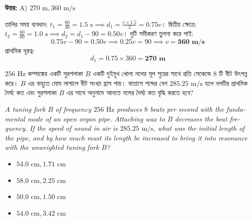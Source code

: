 \documentclass[12pt, a4paper]{article}
\begin{document}
\vspace{0.5em}
\begin{tcolorbox}[answerbox]
    \textbf{\color{success} উত্তর:} A) $270\text{ m}, 360\text{ m/s}$
\end{tcolorbox}
\vspace{1em}

\begin{tcolorbox}[solutionbox={সমাধান (Solution)}]
    \noindent
    তালির সময় ব্যবধান: $t_1 = \frac{60}{40} = 1.5\text{ s} \implies d_1 = \frac{v \times 1.5}{2} = 0.75v$।
    দ্বিতীয় ক্ষেত্রে: $t_2 = \frac{60}{60} = 1.0\text{ s} \implies d_2 = d_1 - 90 = 0.50v$।
    দুটি সমীকরণ তুলনা করে পাই:
    \[ 0.75v - 90 = 0.50v \implies 0.25v = 90 \implies v = \mathbf{360\text{ m/s}} \]
    প্রাথমিক দূরত্ব:
    \[ d_1 = 0.75 \times 360 = \mathbf{270\text{ m}} \]
\end{tcolorbox}

\vspace{2em}

\begin{tcolorbox}[questionbox={প্রশ্ন (Question) 23}]
    \noindent
    $256\text{ Hz}$ কম্পাঙ্কের একটি সুরশলাকা $B$ একটি দুইমুখ খোলা নলের মূল সুরের সাথে প্রতি সেকেন্ডে $8$ টি বীট উৎপন্ন করে। $B$ এর বাহুতে মোম লাগালে বীট সংখ্যা হ্রাস পায়। বাতাসে শব্দের বেগ $285.25\text{ m/s}$ হলে নলটির প্রাথমিক দৈর্ঘ্য কত এবং সুরশলাকা $B$ এর সাথে অনুনাদে আনতে নলের দৈর্ঘ্য কত বৃদ্ধি করতে হবে?
    
    \vspace{0.8em}
    \begin{english}
    \noindent\textit{\color{darkgray}
    A tuning fork $B$ of frequency $256\text{ Hz}$ produces $8$ beats per second with the fundamental mode of an open organ pipe. Attaching wax to $B$ decreases the beat frequency. If the speed of sound in air is $285.25\text{ m/s}$, what was the initial length of the pipe, and by how much must its length be increased to bring it into resonance with the unweighted tuning fork $B$?
    }
    \end{english}
\end{tcolorbox}

\begin{itemize}[label={}, leftmargin=1cm, itemsep=0.5em]
    \item[\textbf{A)}] $54.0\text{ cm}, 1.71\text{ cm}$
    \item[\textbf{B)}] $58.0\text{ cm}, 2.25\text{ cm}$
    \item[\textbf{C)}] $50.0\text{ cm}, 1.50\text{ cm}$
    \item[\textbf{D)}] $54.0\text{ cm}, 3.42\text{ cm}$
\end{itemize}
\end{document}
